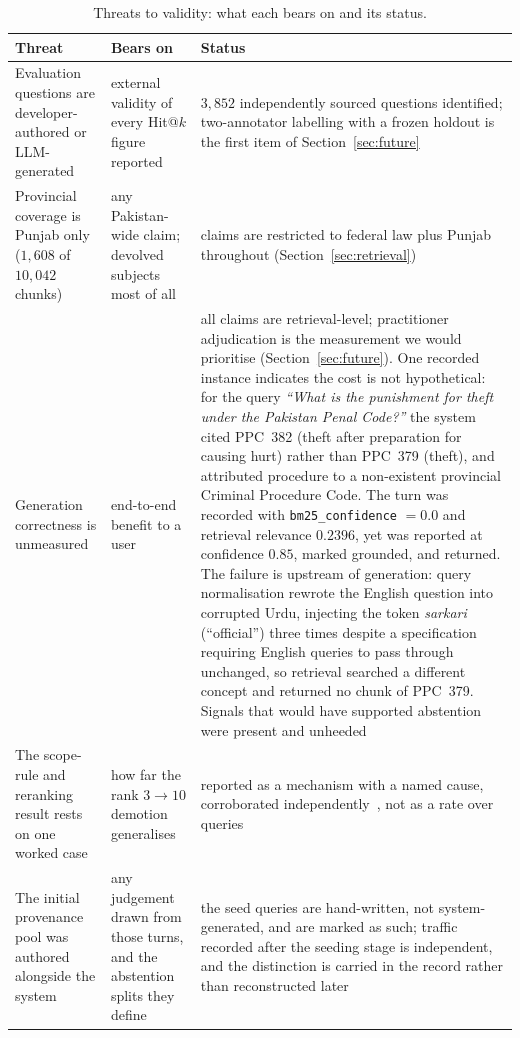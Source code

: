 \documentclass[conference]{IEEEtran}
\begin{document}
\begin{table}[t]
\caption{Threats to validity: what each bears on and its status.}
\label{tab:threats}
\centering
\scriptsize
\begin{tabular}{@{}p{}p{}p{}@{}}
\toprule
Threat & Bears on & Status \\
\midrule
Evaluation questions are developer-authored or LLM-generated &
external validity of every Hit@$k$ figure reported &
$3{,}852$ independently sourced questions identified; two-annotator labelling
with a frozen holdout is the first item of Section~\ref{sec:future} \\

Provincial coverage is Punjab only ($1{,}608$ of $10{,}042$ chunks) &
any Pakistan-wide claim; devolved subjects most of all &
claims are restricted to federal law plus Punjab throughout
(Section~\ref{sec:retrieval}) \\

Generation correctness is unmeasured &
end-to-end benefit to a user &
all claims are retrieval-level; practitioner adjudication is the measurement we
would prioritise (Section~\ref{sec:future}). One recorded instance indicates the
cost is not hypothetical: for the query \emph{``What is the punishment for theft
under the Pakistan Penal Code?''} the system cited PPC~382 (theft after
preparation for causing hurt) rather than PPC~379 (theft), and attributed
procedure to a non-existent provincial Criminal Procedure Code. The turn was
recorded with \texttt{bm25\_confidence} $=0.0$ and retrieval relevance $0.2396$,
yet was reported at confidence $0.85$, marked grounded, and returned. The
failure is upstream of generation: query normalisation rewrote the English
question into corrupted Urdu, injecting the token \emph{sarkari} (``official'')
three times despite a specification requiring English queries to pass through
unchanged, so retrieval searched a different concept and returned no chunk of
PPC~379. Signals that would have supported abstention were present and
unheeded \\

The scope-rule and reranking result rests on one worked case &
how far the rank $3\!\to\!10$ demotion generalises &
reported as a mechanism with a named cause, corroborated
independently~\cite{hou2024clerc}, not as a rate over queries \\

The initial provenance pool was authored alongside the system &
any judgement drawn from those turns, and the abstention splits they define &
the seed queries are hand-written, not system-generated, and are marked as
such; traffic recorded after the seeding stage is independent, and the
distinction is carried in the record rather than reconstructed later \\
\bottomrule
\end{tabular}
\end{table}
\end{document}
